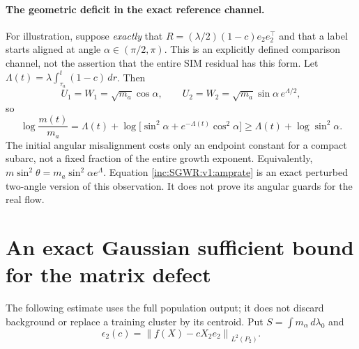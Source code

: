 \documentclass[11pt]{article}
\numberwithin{equation}{section}
\theoremstyle{remark}\newtheorem{remark}[theorem]{Remark}
\newcommand{\dd}{\,d}
\newcommand{\norm}[1]{\left\lVert#1\right\rVert}
\newcommand{\1}{\mathbf1}
\begin{document}
\paragraph{The geometric deficit in the exact reference channel.}
For illustration, suppose \emph{exactly} that
$R=(\lambda/2)(1-c)e_2e_2^\top$ and that a label starts aligned at angle
$\alpha\in(\pi/2,\pi)$. This is an explicitly defined comparison channel,
not the assertion that the entire SIM residual has this form.
Let $\Lambda(t)=\lambda\int_{\tau_a}^{t}(1-c)\dd r$. Then
\[
 U_1=W_1=\sqrt{m_a}\cos\alpha,\qquad
 U_2=W_2=\sqrt{m_a}\sin\alpha\,e^{\Lambda/2},
\]
so
\begin{equation}\label{inc:SGWR:v1:channel}
 \log\frac{m(t)}{m_a}
 =\Lambda(t)+\log\big[\sin^2\alpha+e^{-\Lambda(t)}\cos^2\alpha\big]
 \ge\Lambda(t)+\log\sin^2\alpha.
\end{equation}
The initial angular misalignment costs only an endpoint constant for a
compact subarc, not a fixed fraction of the entire growth exponent.
Equivalently, $m\sin^2\theta=m_a\sin^2\alpha e^{\Lambda}$.
Equation \eqref{inc:SGWR:v1:amprate} is an exact perturbed two-angle version
of this observation. It does not prove its angular guards for the real flow.

\section{An exact Gaussian sufficient bound for the matrix defect}
The following estimate uses the full population output; it does not discard
background or replace a training cluster by its centroid.
Put $S=\int m_\alpha\dd\lambda_0$ and
\[
 \epsilon_2(c)=\norm{f(X)-cX_2e_2}_{L^2(P_2)}.
\]
\end{document}
